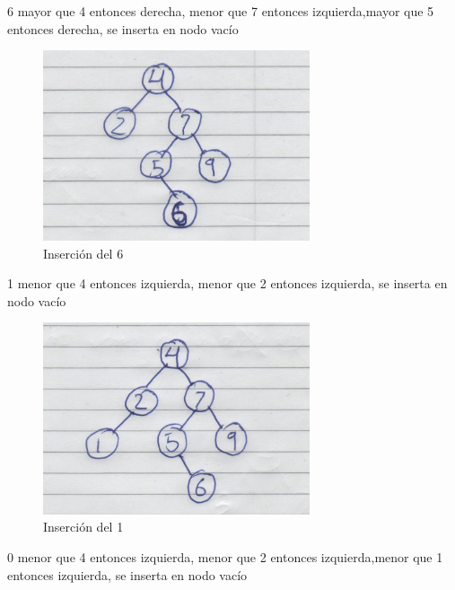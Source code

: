 6 mayor que 4 entonces derecha, menor que 7 entonces izquierda,mayor que 5 entonces derecha, se inserta en nodo vacío
\begin{figure}[H]
	\centering
	\includegraphics[width=0.7\textwidth]{./images/imagen6.jpg}
	\caption{Inserción del 6}
\end{figure} 
1 menor que 4 entonces izquierda, menor que 2 entonces izquierda, se inserta en nodo vacío
\begin{figure}[H]
	\centering
	\includegraphics[width=0.7\textwidth]{./images/imagen7.jpg}
	\caption{Inserción del 1}
\end{figure} 
0 menor que 4 entonces izquierda, menor que 2 entonces izquierda,menor que 1 entonces izquierda, se inserta en nodo vacío

